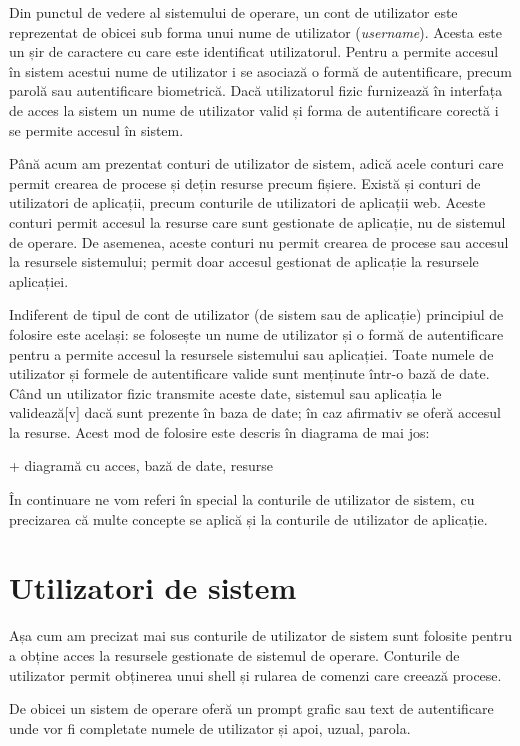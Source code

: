 Din punctul de vedere al sistemului de operare, un cont de utilizator este
reprezentat de obicei sub forma unui nume de utilizator (\textit{username}).
Acesta este un șir de caractere cu care este identificat utilizatorul. Pentru a
permite accesul în sistem acestui nume de utilizator i se asociază o formă de
autentificare, precum parolă sau autentificare biometrică. Dacă utilizatorul
fizic furnizează în interfața de acces la sistem un nume de utilizator valid și
forma de autentificare corectă i se permite accesul în sistem.

Până acum am prezentat conturi de utilizator de sistem, adică acele conturi care
permit crearea de procese și dețin resurse precum fișiere. Există și conturi de
utilizatori de aplicații, precum conturile de utilizatori de aplicații web.
Aceste conturi permit accesul la resurse care sunt gestionate de aplicație, nu
de sistemul de operare. De asemenea, aceste conturi nu permit crearea de procese
sau accesul la resursele sistemului; permit doar accesul gestionat de aplicație
la resursele aplicației.

Indiferent de tipul de cont de utilizator (de sistem sau de aplicație)
principiul de folosire este același: se folosește un nume de utilizator și o
formă de autentificare pentru a permite accesul la resursele sistemului sau
aplicației. Toate numele de utilizator și formele de autentificare valide sunt
menținute într-o bază de date. Când un utilizator fizic transmite aceste date,
sistemul sau aplicația le validează[v] dacă sunt prezente în baza de date; în
caz afirmativ se oferă accesul la resurse. Acest mod de folosire este descris în
diagrama de mai jos:

+ diagramă cu acces, bază de date, resurse

În continuare ne vom referi în special la conturile de utilizator de sistem, cu
precizarea că multe concepte se aplică și la conturile de utilizator de
aplicație.

\section{Utilizatori de sistem}
\label{sec:users-sistem}

Așa cum am precizat mai sus conturile de utilizator de sistem sunt folosite
pentru a obține acces la resursele gestionate de sistemul de operare. Conturile
de utilizator permit obținerea unui shell și rularea de comenzi care creează
procese.

De obicei un sistem de operare oferă un prompt grafic sau text de autentificare
unde vor fi completate numele de utilizator și apoi, uzual, parola.

